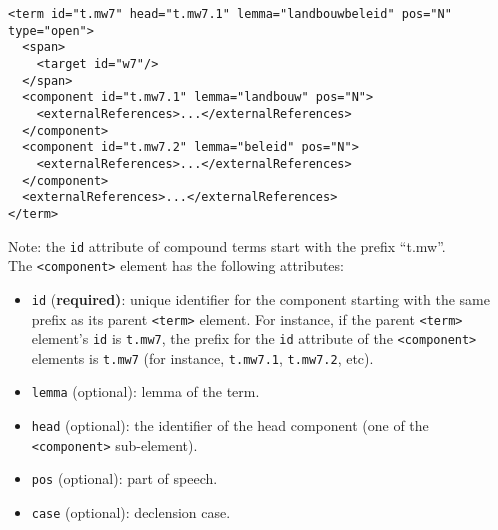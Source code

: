 \begin{Verbatim}[fontsize=\small]
<term id="t.mw7" head="t.mw7.1" lemma="landbouwbeleid" pos="N" type="open">
  <span>
    <target id="w7"/>
  </span>
  <component id="t.mw7.1" lemma="landbouw" pos="N">
    <externalReferences>...</externalReferences>
  </component>
  <component id="t.mw7.2" lemma="beleid" pos="N">
    <externalReferences>...</externalReferences>
  </component>
  <externalReferences>...</externalReferences>
</term>
\end{Verbatim}

Note: the \texttt{id} attribute of compound terms start with the prefix ``t.mw''.\\

The \texttt{<component>} element has the following attributes:
\begin{itemize}
\item \texttt{id} (\textbf{required)}: unique identifier for the component
  starting with the same prefix as its parent \texttt{<term>} element. For
  instance, if the parent \texttt{<term>} element's \texttt{id} is
  \texttt{t.mw7}, the prefix for the \texttt{id} attribute of the
  \texttt{<component>} elements is \texttt{t.mw7} (for instance,
  \texttt{t.mw7.1}, \texttt{t.mw7.2}, etc).
\item \texttt{lemma} (optional): lemma of the term.
\item \texttt{head} (optional): the identifier of the head component (one of
  the \texttt{<component>} sub-element).
\item \texttt{pos} (optional): part of speech.
\item \texttt{case} (optional): declension case.
\end{itemize}


